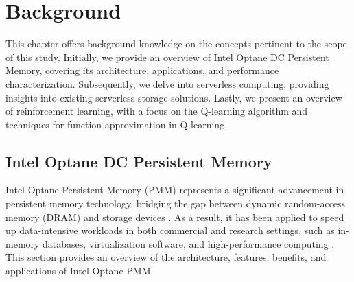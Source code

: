 


\chapter[Background]{Background}

This chapter offers background knowledge on the concepts pertinent to the scope of this study. Initially, we provide an overview of Intel Optane DC Persistent Memory, covering its architecture, applications, and performance characterization. Subsequently, we delve into serverless computing, providing insights into existing serverless storage solutions. Lastly, we present an overview of reinforcement learning, with a focus on the Q-learning algorithm and techniques for function approximation in Q-learning.

\section{Intel Optane DC Persistent Memory}

Intel Optane Persistent Memory (PMM) represents a significant advancement in persistent memory technology, bridging the gap between dynamic random-access memory (DRAM) and storage devices \cite{scargall2020pmem}. As a result, it has been applied to speed up data-intensive workloads in both commercial and research settings, such as in-memory databases, virtualization software, and high-performance computing \cite{peng2020demystifying,SolveMod32:online}. This section provides an overview of the architecture, features, benefits, and applications of Intel Optane PMM.

